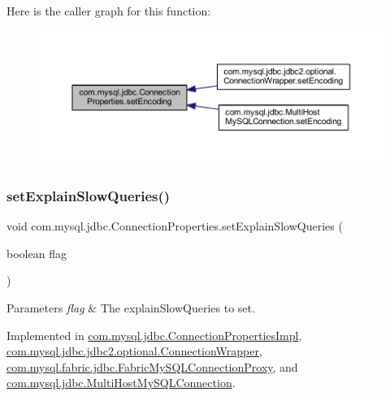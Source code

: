 Here is the caller graph for this function\+:\nopagebreak
\begin{figure}[H]
\begin{center}
\leavevmode
\includegraphics[width=350pt]{interfacecom_1_1mysql_1_1jdbc_1_1_connection_properties_a8d675a0b52e236df15eec3c77dfd8089_icgraph}
\end{center}
\end{figure}
\mbox{\label{interfacecom_1_1mysql_1_1jdbc_1_1_connection_properties_a9857fb61eea34e28c3bbff76b6ac5ca9}} 
\subsubsection{\texorpdfstring{set\+Explain\+Slow\+Queries()}{setExplainSlowQueries()}}
{\footnotesize\ttfamily void com.\+mysql.\+jdbc.\+Connection\+Properties.\+set\+Explain\+Slow\+Queries (\begin{DoxyParamCaption}\item[{boolean}]{flag }\end{DoxyParamCaption})}


\begin{DoxyParams}{Parameters}
{\em flag} & The explain\+Slow\+Queries to set. \\
\hline
\end{DoxyParams}


Implemented in \mbox{\hyperlink{classcom_1_1mysql_1_1jdbc_1_1_connection_properties_impl_a1b81f63fa5225f51a4cc0a7cf1a2c593}{com.\+mysql.\+jdbc.\+Connection\+Properties\+Impl}}, \mbox{\hyperlink{classcom_1_1mysql_1_1jdbc_1_1jdbc2_1_1optional_1_1_connection_wrapper_a87b59ff60acc2b82007b597ca7c56799}{com.\+mysql.\+jdbc.\+jdbc2.\+optional.\+Connection\+Wrapper}}, \mbox{\hyperlink{classcom_1_1mysql_1_1fabric_1_1jdbc_1_1_fabric_my_s_q_l_connection_proxy_a4453afa8d1a564048c9965e198072e7c}{com.\+mysql.\+fabric.\+jdbc.\+Fabric\+My\+S\+Q\+L\+Connection\+Proxy}}, and \mbox{\hyperlink{classcom_1_1mysql_1_1jdbc_1_1_multi_host_my_s_q_l_connection_aae6e6a98dc0bdfbf91fd7e5eecb0e1ca}{com.\+mysql.\+jdbc.\+Multi\+Host\+My\+S\+Q\+L\+Connection}}.

